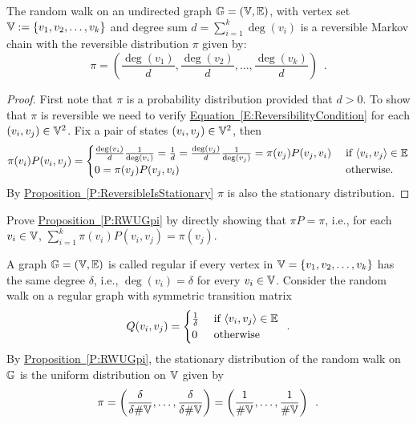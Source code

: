 {\begin{prop}\label{P:RWUGpi}
The random walk on an undirected graph $\mathbb{G}=(\mathbb{V},\mathbb{E})$, with vertex set $\mathbb{V}:= \{v_1,v_2,\ldots,v_k\}$ and degree sum $d = \sum_{i=1}^k{\deg(v_i)}$ is a reversible Markov chain with the reversible distribution $\pi$ given by:
\[
\pi = \left( \frac{\deg(v_1)}{d}, \frac{\deg(v_2)}{d}, \ldots, \frac{\deg(v_k)}{d}  \right) \enspace .
\]
\begin{proof}
First note that $\pi$ is a probability distribution provided that $d > 0$.  
To show that $\pi$ is reversible we need to verify \hyperref[E:ReversibilityCondition]{Equation~\ref*{E:ReversibilityCondition}} for each $(v_i,v_j) \in \mathbb{V}^2$.  
Fix a pair of states $(v_i,v_j) \in \mathbb{V}^2$, then
\begin{eqnarray*}
\pi(v_i) P(v_i,v_j) = 
\begin{cases}
\frac{\deg(v_i)}{d}\frac{1}{\deg(v_i)}=\frac{1}{d}=\frac{\deg(v_j)}{d}\frac{1}{\deg(v_j)}=\pi(v_j) P(v_j,v_i) & \text{ if } \langle v_i, v_j \rangle \in \mathbb{E}\\
0 = \pi(v_j) P(v_j,v_i) & \text{ otherwise}.
\end{cases}
\end{eqnarray*} 
By \hyperref[P:ReversibleIsStationary]{Proposition~\ref*{P:ReversibleIsStationary}} $\pi$ is also the stationary distribution.
\end{proof}
\end{prop}

\begin{exercise}\label{EXR:DirectlyProveRWUGpi}
Prove \hyperref[P:RWUGpi]{Proposition~\ref*{P:RWUGpi}} by directly showing that $\pi P = \pi$, i.e., for each $v_i \in \mathbb{V}$, $\sum_{i=1}^k \pi(v_i) P(v_i, v_j) = \pi(v_j)$.
\end{exercise}

\begin{example}\label{EX:RWRegGraph}
A graph $\mathbb{G}=(\mathbb{V},\mathbb{E})$ is called regular if every vertex in $\mathbb{V}=\{v_1,v_2,\ldots,v_k\}$ has the same degree $\delta$, i.e., $\deg(v_i)=\delta$ for every $v_i \in \mathbb{V}$.  
Consider the random walk on a regular graph with symmetric transition matrix 
\[
Q(v_i,v_j) = 
\begin{cases} 
\frac{1}{\delta} & \text{ if } \langle v_i,v_j \rangle \in \mathbb{E} \\
0 & \text{ otherwise}
\end{cases} \enspace .
\]
By \hyperref[P:RWUGpi]{Proposition~\ref*{P:RWUGpi}}, the stationary distribution of the random walk on $\mathbb{G}$ is the uniform distribution on $\mathbb{V}$ given by
\[
\pi 
= \left( \frac{\delta}{\delta \#\mathbb{V} }, \ldots , \frac{\delta}{\delta \#\mathbb{V}}  \right) 
= \left( \frac{1}{\#\mathbb{V}}, \ldots , \frac{1}{\#\mathbb{V}} \right) 
\enspace .
\]
\end{example}


}
